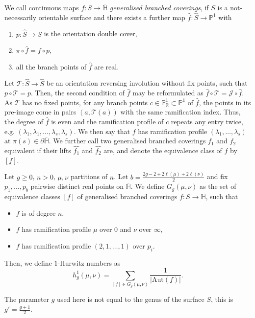 We call continuous maps $f\colon S\to\overline{\mathbb{H}}$ \textit{generalised branched coverings}, if $S$ is a not-necessarily orientable surface and there exists a further map $\hat{f}\colon \hat{S}\to\mathbb{P}^1$ with
    \begin{enumerate}
        \item $p\colon\hat{S}\to S$ is the orientation double cover,
        \item $\pi\circ\hat{f}=f\circ p$,
        \item all the branch points of $\hat{f}$ are real.
    \end{enumerate}
Let $\mathcal{T}\colon \hat{S}\to\hat{S}$ be an orientation reversing involution without fix points, such that $p\circ \mathcal{T}=p$. Then, the second condition of $\hat{f}$ may be reformulated as $\hat{f}\circ\mathcal{T}=\mathcal{J}\circ \hat{f}$. As $\mathcal{T}$ has no fixed points, for any branch points $c\in\mathbb{P}^1_{\mathbb{R}}\subset\mathbb{P}^1$ of $\hat{f}$, the points in its pre-image come in pairs $(a,\mathcal{T}(a))$ with the same ramification index. Thus, the degree of $\hat{f}$ is even and the ramification profile of $c$ repeats any entry twice, e.g. $(\lambda_1,\lambda_1,\dots,\lambda_s,\lambda_s)$. We then say that $f$ has ramification profile $(\lambda_1,\dots,\lambda_s)$ at $\pi(s)\in\partial\overline{\mathbb{H}}$. We further call two generalised branched coverings $f_1$ and $f_2$ equivalent if their lifts $\hat{f_1}$ and $\hat{f_2}$ are, and denote the equivalence class of $f$ by $[f]$. 

\begin{defi}\label{def-nonoriented}
    Let $g\ge0$, $n>0$, $\mu,\nu$ partitions of $n$. Let $b=\frac{2g-2+2\ell(\mu)+2\ell(\nu)}{2}$ and fix $p_1,\dots,p_b$ pairwise distinct real points on $\overline{\mathbb{H}}$. We define $G_g(\mu,\nu)$ as the set of equivalence classes $[f]$ of generalised branched coverings $f\colon S\to\overline{\mathbb{H}}$, such that
    \begin{itemize}
        \item $f$ is of degree $n$,
        \item $f$ has ramification profile $\mu$ over $0$ and $\nu$ over $\infty$,
        \item $f$ has ramification profile $(2,1,\dots,1)$ over $p_i$.
    \end{itemize}
    Then, we define $1$-Hurwitz numbers as
    \begin{equation*}
        h^1_g(\mu,\nu)=\sum_{[f]\in G_g(\mu,\nu)}\frac{1}{|\mathrm{Aut}(f)|}.
    \end{equation*}
\end{defi}
The parameter $g$ used here is not equal to the genus of the surface $S$, this is $g'=\frac{g+1}{2}.$

